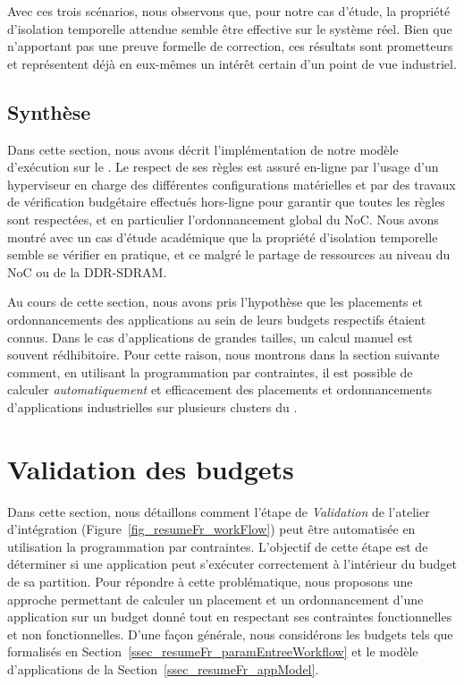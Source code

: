 \documentclass[main.tex]{subfiles}
\begin{document}
Avec ces trois scénarios, nous observons que, pour notre cas d'étude, la propriété d'isolation temporelle attendue semble être effective sur le système réel. Bien que n'apportant pas une preuve formelle de correction, ces résultats sont prometteurs et représentent déjà en eux-mêmes un intérêt certain d'un point de vue industriel.

\subsection{Synthèse}
Dans cette section, nous avons décrit l'implémentation de notre modèle d'exécution sur le \mppalong. Le respect de ses règles est assuré en-ligne par l'usage d'un hyperviseur en charge des différentes configurations matérielles et par des travaux de vérification budgétaire effectués hors-ligne pour garantir que toutes les règles sont respectées, et en particulier l'ordonnancement global du NoC. Nous avons montré avec un cas d'étude académique que la propriété d'isolation temporelle semble se vérifier en pratique, et ce malgré le partage de ressources au niveau du NoC ou de la DDR-SDRAM.

Au cours de cette section, nous avons pris l'hypothèse que les placements et ordonnancements des applications au sein de leurs budgets respectifs étaient connus. Dans le cas d'applications de grandes tailles, un calcul manuel est souvent rédhibitoire. Pour cette raison, nous montrons dans la section suivante comment, en utilisant la programmation par contraintes, il est possible de calculer \emph{automatiquement} et efficacement des placements et ordonnancements d'applications industrielles sur plusieurs clusters du \mppalong. 


\section{Validation des budgets}
\label{sec_resumeFr_validation}
Dans cette section, nous détaillons comment l'étape de \emph{Validation} de l'atelier d'intégration (Figure~\ref{fig_resumeFr_workFlow}) peut être automatisée en utilisation la programmation par contraintes. L'objectif de cette étape est de déterminer si une application peut s'exécuter correctement à l'intérieur du budget de sa partition. Pour répondre à cette problématique, nous proposons une approche permettant de calculer un placement et un ordonnancement d'une application sur un budget donné tout en respectant ses contraintes fonctionnelles et non fonctionnelles. D'une façon générale, nous considérons les budgets tels que formalisés en Section~\ref{ssec_resumeFr_paramEntreeWorkflow} et le modèle d'applications de la Section~\ref{ssec_resumeFr_appModel}.
\end{document}
